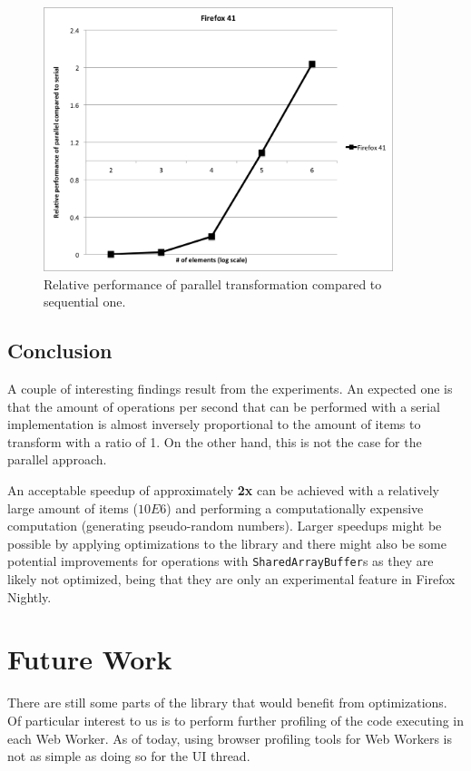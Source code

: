 \documentclass[runningheads,a4paper]{llncs}
\begin{document}
\begin{figure}
\centering
\includegraphics[height=7.7cm]{comparison}
\caption{Relative performance of parallel transformation compared to sequential one.}
\label{fig:relative}
\end{figure}

\subsection{Conclusion}
A couple of interesting findings result from the experiments. An expected one is that the amount of operations per second that can be performed with a serial implementation is almost inversely proportional to the amount of items to transform with a ratio of 1. On the other hand, this is not the case for the parallel approach.

An acceptable speedup of approximately \textbf{2x} can be achieved with a relatively large amount of items (\(10E6\)) and performing a computationally expensive computation (generating pseudo-random numbers). Larger speedups might be possible by applying optimizations to the library and there might also be some potential improvements for operations with \verb+SharedArrayBuffer+s as they are likely not optimized, being that they are only an experimental feature in Firefox Nightly.

\section{Future Work}\label{sec:future}
There are still some parts of the library that would benefit from optimizations. Of particular interest to us is to perform further profiling of the code executing in each Web Worker. As of today, using browser profiling tools for Web Workers is not as simple as doing so for the UI thread.\\
\end{document}
